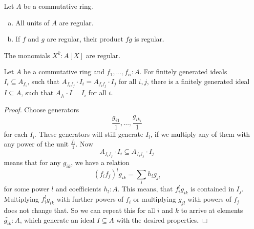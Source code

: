 \begin{lemma}%
  \label{units-products-regular}
  Let $A$ be a commutative ring.
  \begin{enumerate}[(a)]
  \item All units of $A$ are regular.
  \item If $f$ and $g$ are regular, their product $fg$ is regular.
  \end{enumerate}
\end{lemma}

\begin{example}
  The monomials $X^k:A[X]$ are regular.
\end{example}

\begin{lemma}%
  \label{fg-ideal-local-global}
  Let $A$ be a commutative ring and $f_1,\dots,f_n:A$.
  For finitely generated ideals $I_i\subseteq A_{f_i}$,
  such that $A_{f_if_j}\cdot I_i=A_{f_if_j}\cdot I_j$ for all $i,j$,
  there is a finitely generated ideal $I\subseteq A$,
  such that $A_{f_i}\cdot I=I_i$ for all $i$.
\end{lemma}

\begin{proof}
  Choose generators 
  \[ \frac{g_{i1}}{1},\dots,\frac{g_{ik_i}}{1} \]
  for each $I_i$.
  These generators will still generate $I_i$, if we multiply any of them with any power of the unit $\frac{f_i}{1}$.
  Now
  \[ A_{f_if_j}\cdot I_i\subseteq A_{f_if_j}\cdot I_j \]
  means that for any $g_{ik}$, we have a relation
  \[ (f_if_j)^l g_{ik}=\sum_{l}h_{l}g_{jl}\]
  for some power $l$ and coefficients $h_{l}:A$.
  This means, that $f_i^lg_{ik}$ is contained in $I_j$.
  Multiplying $f_i^lg_{ik}$ with further powers of $f_i$ or multiplying $g_{jl}$ with powers of $f_j$ does not change that.
  So we can repeat this for all $i$ and $k$ to arrive at elements $\tilde{g_{ik}}:A$,
  which generate an ideal $I\subseteq A$ with the desired properties.
\end{proof}

